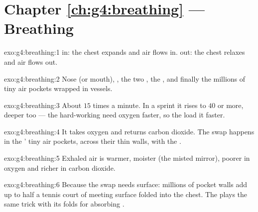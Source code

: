 \section*{Chapter \ref{ch:g4:breathing} --- Breathing}

\begin{solution}{exo:g4:breathing:1}
 in: the chest expands and air flows in. 
out: the chest relaxes and air flows out.
\end{solution}

\begin{solution}{exo:g4:breathing:2}
Nose (or mouth), , the two , the , and
finally the millions of tiny air pockets wrapped in 
vessels.
\end{solution}

\begin{solution}{exo:g4:breathing:3}
About $15$ times a minute. In a sprint it rises to $40$ or
more, deeper too --- the hard-working  need oxygen
faster, so the  load it faster.
\end{solution}

\begin{solution}{exo:g4:breathing:4}
It takes oxygen and returns carbon dioxide. The swap happens
in the ' tiny air pockets, across their thin walls, with
the .
\end{solution}

\begin{solution}{exo:g4:breathing:5}
Exhaled air is warmer, moister (the misted mirror), poorer in
oxygen and richer in carbon dioxide.
\end{solution}

\begin{solution}{exo:g4:breathing:6}
Because the  swap needs surface: millions of pocket
walls add up to half a tennis court of meeting surface folded
into the chest. The  plays the same trick with
its folds for absorbing .
\end{solution}

